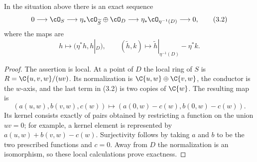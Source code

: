 \begin{lemma}
\label{lem:conductor}
In the situation above there is an exact sequence
\[
0\longrightarrow\cO_S\longrightarrow
 \eta_*\cO_{\widetilde S}\oplus\cO_D
\longrightarrow\eta_*\cO_{\eta^{-1}(D)}\longrightarrow0,
\tag{3.2}
\]
where the maps are
\[
h\longmapsto(\eta^*h,h|_D),\qquad
(\widetilde h,k)\longmapsto\widetilde h|_{\eta^{-1}(D)}-\eta^*k.
\]
\end{lemma}

\begin{proof}
The assertion is local.  At a point of $D$ the local ring of $S$ is
\(R=\C\{u,v,w\}/(uv)\).  Its normalization is
\(\C\{u,w\}\oplus\C\{v,w\}\), the conductor is the $w$-axis, and the
last term in (3.2) is two copies of $\C\{w\}$.  The resulting map is
\[
 (a(u,w),b(v,w),c(w))\longmapsto
 (a(0,w)-c(w),b(0,w)-c(w)).
 \tag{3.3}
\]
Its kernel consists exactly of pairs obtained by restricting a function on
the union $uv=0$; for example, a kernel element is represented by
$a(u,w)+b(v,w)-c(w)$.  Surjectivity follows by taking $a$ and $b$ to be
the two prescribed functions and $c=0$.  Away from $D$ the normalization is
an isomorphism, so these local calculations prove exactness.
\end{proof}

